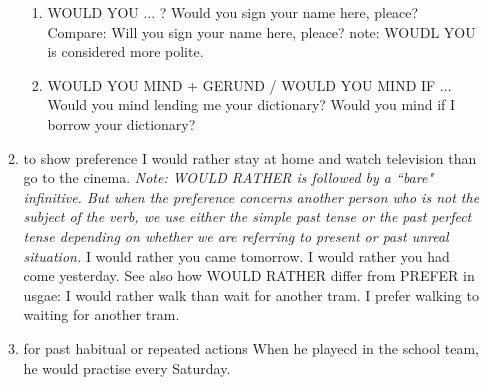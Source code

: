 \begin{enumerate}
\begin{enumerate}
                \begin{enumerate}
                    \item WOULD YOU ... ?
                        \newline
                        \newline
                        Would you sign your name here, pleace?
                        \newline
                        Compare: Will you sign your name here, pleace?
                        \newline
                        note: WOUDL YOU is considered more polite.
                    \item WOULD YOU MIND + GERUND / WOULD  YOU MIND IF ...
                        \newline
                        \newline
                        Would you mind lending me your dictionary?
                        \newline
                        Would you mind if I borrow your dictionary?
                \end{enumerate}
            \item to show preference
                \newline
                \newline
                I would rather stay at home and watch television than go to the
                cinema.
                \newline
                \newline
                {\it Note: WOULD RATHER is followed by a ``bare" infinitive. But
                when the preference concerns another person who is not the
                subject of the verb, we use either the simple past tense or the
                past perfect tense depending on whether we are referring to
                present or past unreal situation.}
                \newline
                \newline
                I would rather you came tomorrow.
                \newline
                I would rather you had come yesterday.
                \newline
                \newline
                See also how WOULD RATHER differ from PREFER in usgae:
                \newline
                \newline
                I would rather walk than wait for another tram.
                \newline
                I prefer walking to waiting for another tram.
            \item for past habitual or repeated actions
                \newline
                \newline
                When he playecd in the school team, he would practise every
                Saturday.
        \end{enumerate}
\end{enumerate}
